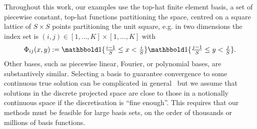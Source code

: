 Throughout this work, our examples use the top-hat finite element basis, a set of piecewise constant, top-hat functions partitioning the space, centred on a square lattice of \(S\times S\) points partitioning the unit square, e.g. in two dimensions the index set is \((i,j) \in [1,\dots,K]\times [1,\dots,K]\) with %
\begin{align*}
\Phi_{ij}(x,y) := \textstyle \one\{\frac{i-1}{S}\leq x<\frac{i}{S}\}\one\{\frac{j-1}{S}\leq y<\frac{j}{S}\}.
\end{align*}
Other bases, such as piecewise linear, Fourier, or polynomial bases, are substantively similar.
Selecting a basis to guarantee convergence to some continuous true solution can be complicated in general~\cite{LassasDiscretizationinvariant2009} but we assume that solutions in the discrete projected space are close to those in a notionally continuous space if the discretisation is  ``fine enough''.
This requires that our methods must be feasible for large basis sets, on the order of thousands or millions of basis functions.
